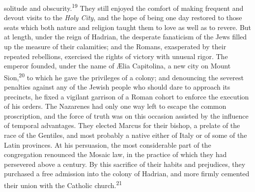 solitude and obscurity.\textsuperscript{19} They still enjoyed the comfort of
making frequent and devout visits to the \textit{Holy City}, and the
hope of being one day restored to those seats which both nature
and religion taught them to love as well as to revere. But at
length, under the reign of Hadrian, the desperate fanaticism of
the Jews filled up the measure of their calamities; and the
Romans, exasperated by their repeated rebellions, exercised the
rights of victory with unusual rigor. The emperor founded, under
the name of Ælia Capitolina, a new city on Mount Sion,\textsuperscript{20} to
which he gave the privileges of a colony; and denouncing the
severest penalties against any of the Jewish people who should
dare to approach its precincts, he fixed a vigilant garrison of a
Roman cohort to enforce the execution of his orders. The
Nazarenes had only one way left to escape the common
proscription, and the force of truth was on this occasion
assisted by the influence of temporal advantages. They elected
Marcus for their bishop, a prelate of the race of the Gentiles,
and most probably a native either of Italy or of some of the
Latin provinces. At his persuasion, the most considerable part of
the congregation renounced the Mosaic law, in the practice of
which they had persevered above a century. By this sacrifice of
their habits and prejudices, they purchased a free admission into
the colony of Hadrian, and more firmly cemented their union with
the Catholic church.\textsuperscript{21}






